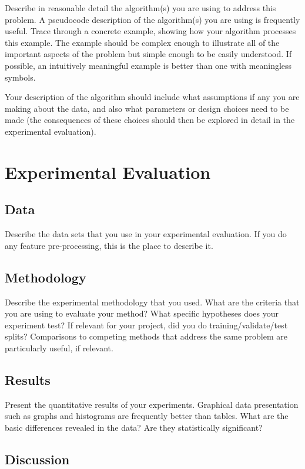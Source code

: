 \documentclass{article}
\begin{document}
Describe in reasonable detail the algorithm(s) you are using to address this problem. A pseudocode description of the algorithm(s) you are using is frequently useful. Trace through a concrete example, showing how your algorithm processes this example. The example should be complex enough to illustrate all of the important aspects of the problem but simple enough to be easily understood. If possible, an intuitively meaningful example is better than one with meaningless symbols.

Your description of the algorithm should include what assumptions if any you are making about the data, and also what parameters or design choices need to be made (the consequences of these choices should then be explored in detail in the experimental evaluation).

\section{Experimental Evaluation}

\subsection{Data}

Describe the data sets that you use in your experimental evaluation. If you do any feature pre-processing, this is the place to describe it.

\subsection{Methodology}
Describe the experimental methodology that you used. What are the
criteria that you are using to evaluate your method? What specific
hypotheses does your experiment test? If relevant for your project, did you do training/validate/test splits?
Comparisons to competing methods that address the same problem are
particularly useful, if relevant.

\subsection{Results}

Present the quantitative results of your experiments. Graphical data presentation such as graphs and histograms are frequently better than tables. What are the basic differences revealed in the data? Are they statistically significant? 

\subsection{Discussion}
\end{document}
